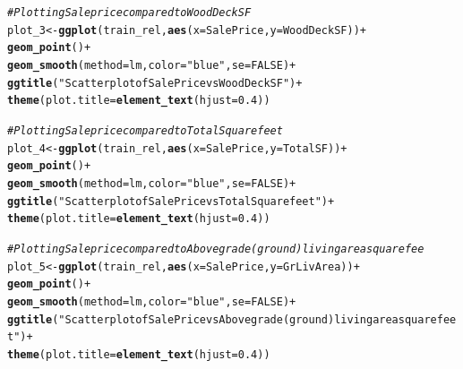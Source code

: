 \documentclass{article}\usepackage[]{graphicx}\usepackage[]{color}
\makeatletter
\newcommand{\hlnum}[1]{\textcolor[rgb]{0.686,0.059,0.569}{#1}}%
\newcommand{\hlstr}[1]{\textcolor[rgb]{0.192,0.494,0.8}{#1}}%
\newcommand{\hlcom}[1]{\textcolor[rgb]{0.678,0.584,0.686}{\textit{#1}}}%
\newcommand{\hlopt}[1]{\textcolor[rgb]{0,0,0}{#1}}%
\newcommand{\hlstd}[1]{\textcolor[rgb]{0.345,0.345,0.345}{#1}}%
\newcommand{\hlkwb}[1]{\textcolor[rgb]{0.69,0.353,0.396}{#1}}%
\newcommand{\hlkwc}[1]{\textcolor[rgb]{0.333,0.667,0.333}{#1}}%
\newcommand{\hlkwd}[1]{\textcolor[rgb]{0.737,0.353,0.396}{\textbf{#1}}}%
\newenvironment{kframe}{%
 \def\at@end@of@kframe{}%
 \ifinner\ifhmode%
  \def\at@end@of@kframe{\end{minipage}}%
  \begin{minipage}{\columnwidth}%
 \fi\fi%
 \def\FrameCommand##1{\hskip\@totalleftmargin \hskip-\fboxsep
 \colorbox{shadecolor}{##1}\hskip-\fboxsep
     \hskip-\linewidth \hskip-\@totalleftmargin \hskip\columnwidth}%
 \MakeFramed {\advance\hsize-\width
   \@totalleftmargin\z@ \linewidth\hsize
   \@setminipage}}%
 {\par\unskip\endMakeFramed%
 \at@end@of@kframe}
\newenvironment{knitrout}{}{} %
\makeatother
\begin{document}
\begin{knitrout}
\begin{kframe}
{\ttfamily\noindent\bfseries\color{errorcolor}{\#\# Error in ggplot(train\_rel, aes(x = SalePrice, y = YearBuilt)): object 'train\_rel' not found}}\begin{alltt}
\hlcom{# Plotting Sale price compared to Wood Deck SF}
\hlstd{plot_3} \hlkwb{<-} \hlkwd{ggplot}\hlstd{(train_rel,} \hlkwd{aes}\hlstd{(}\hlkwc{x}\hlstd{= SalePrice,} \hlkwc{y} \hlstd{= WoodDeckSF))} \hlopt{+}
    \hlkwd{geom_point}\hlstd{()}\hlopt{+}
    \hlkwd{geom_smooth}\hlstd{(}\hlkwc{method}\hlstd{=lm ,} \hlkwc{color}\hlstd{=}\hlstr{"blue"}\hlstd{,} \hlkwc{se}\hlstd{=}\hlnum{FALSE}\hlstd{)} \hlopt{+}
    \hlkwd{ggtitle}\hlstd{(}\hlstr{"Scatterplot of Sale Price vs Wood Deck SF"}\hlstd{)} \hlopt{+}
    \hlkwd{theme}\hlstd{(}\hlkwc{plot.title} \hlstd{=} \hlkwd{element_text}\hlstd{(}\hlkwc{hjust} \hlstd{=} \hlnum{0.4}\hlstd{))}
\end{alltt}


{\ttfamily\noindent\bfseries\color{errorcolor}{\#\# Error in ggplot(train\_rel, aes(x = SalePrice, y = WoodDeckSF)): object 'train\_rel' not found}}\begin{alltt}
\hlcom{#  Plotting Sale price compared to Total Square feet}
\hlstd{plot_4} \hlkwb{<-} \hlkwd{ggplot}\hlstd{(train_rel,} \hlkwd{aes}\hlstd{(}\hlkwc{x}\hlstd{= SalePrice,} \hlkwc{y} \hlstd{= TotalSF))} \hlopt{+}
    \hlkwd{geom_point}\hlstd{()}\hlopt{+}
    \hlkwd{geom_smooth}\hlstd{(}\hlkwc{method}\hlstd{=lm ,} \hlkwc{color}\hlstd{=}\hlstr{"blue"}\hlstd{,} \hlkwc{se}\hlstd{=}\hlnum{FALSE}\hlstd{)} \hlopt{+}
    \hlkwd{ggtitle}\hlstd{(}\hlstr{"Scatterplot of Sale Price vs Total Square feet"}\hlstd{)} \hlopt{+}
    \hlkwd{theme}\hlstd{(}\hlkwc{plot.title} \hlstd{=} \hlkwd{element_text}\hlstd{(}\hlkwc{hjust} \hlstd{=} \hlnum{0.4}\hlstd{))}
\end{alltt}


{\ttfamily\noindent\bfseries\color{errorcolor}{\#\# Error in ggplot(train\_rel, aes(x = SalePrice, y = TotalSF)): object 'train\_rel' not found}}\begin{alltt}
\hlcom{#  Plotting Sale price compared to Above grade (ground) living area square fee}
\hlstd{plot_5} \hlkwb{<-} \hlkwd{ggplot}\hlstd{(train_rel,} \hlkwd{aes}\hlstd{(}\hlkwc{x}\hlstd{= SalePrice,} \hlkwc{y} \hlstd{= GrLivArea))} \hlopt{+}
    \hlkwd{geom_point}\hlstd{()}\hlopt{+}
    \hlkwd{geom_smooth}\hlstd{(}\hlkwc{method}\hlstd{=lm ,} \hlkwc{color}\hlstd{=}\hlstr{"blue"}\hlstd{,} \hlkwc{se}\hlstd{=}\hlnum{FALSE}\hlstd{)} \hlopt{+}
    \hlkwd{ggtitle}\hlstd{(}\hlstr{"Scatterplot of Sale Price vs Above grade (ground) living area square feet"}\hlstd{)} \hlopt{+}
    \hlkwd{theme}\hlstd{(}\hlkwc{plot.title} \hlstd{=} \hlkwd{element_text}\hlstd{(}\hlkwc{hjust} \hlstd{=} \hlnum{0.4}\hlstd{))}
\end{alltt}



\end{kframe}
\end{knitrout}
\end{document}
